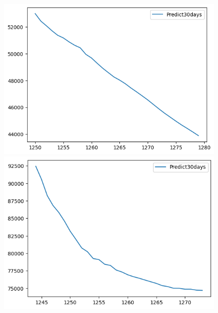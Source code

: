 \begin{figure}[H]
\begin{minipage}{0.15\textwidth}
    \centering
    \includegraphics[width=1\textwidth]{resources/chapter-5/predicted/BIDV_ RNN_9-1_30days.png}
    \end{minipage}
    \hfill
    \begin{minipage}{0.15\textwidth}
    \centering
    \includegraphics[width=1\textwidth]{resources/chapter-5/predicted/VCB_ RNN_7-3_30days.png}
    \end{minipage}
    \hfill
    \begin{minipage}{0.15\textwidth}
    \centering

\end{minipage}
\end{figure}
